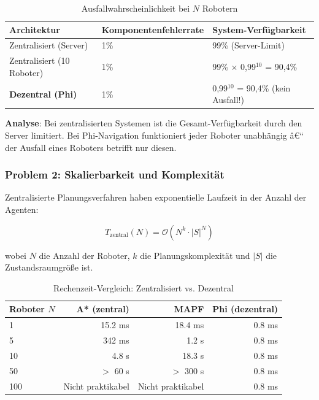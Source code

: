 ﻿\documentclass[a4paper,12pt]{article}
\theoremstyle{definition}
\begin{document}
\begin{table}[H]
	\centering
	\caption{Ausfallwahrscheinlichkeit bei $N$ Robotern}
	\label{tab:failure_prob}
	\begin{tabular}{p{4.5cm}p{4cm}p{4.5cm}}
		\toprule
		\textbf{Architektur} & \textbf{Komponenten\-fehlerrate} & \textbf{System-Verfügbarkeit} \\
		\midrule
		Zentralisiert (Server) & 1\% & 99\% (Server-Limit) \\
		Zentralisiert (10 Roboter) & 1\% & 99\% $\times$ 0,99$^{10}$ = 90,4\% \\
		\textbf{Dezentral (Phi)} & 1\% & 0,99$^{10}$ = 90,4\% (kein Ausfall!) \\
		\bottomrule
	\end{tabular}
\end{table}

\textbf{Analyse}: Bei zentralisierten Systemen ist die Gesamt-Verfügbarkeit durch den Server limitiert. Bei Phi-Navigation funktioniert jeder Roboter unabhängig â€“ der Ausfall eines Roboters betrifft nur diesen.

\subsubsection{Problem 2: Skalierbarkeit und Komplexität}

Zentralisierte Planungsverfahren haben exponentielle Laufzeit in der Anzahl der Agenten:

\begin{equation}
T_{\text{zentral}}(N) = \mathcal{O}(N^k \cdot |S|^N)
\end{equation}

wobei $N$ die Anzahl der Roboter, $k$ die Planungskomplexität und $|S|$ die Zustandsraumgröße ist.

\begin{table}[H]
	\centering
	\caption{Rechenzeit-Vergleich: Zentralisiert vs. Dezentral}
	\label{tab:scaling}
	\begin{tabular}{lrrr}
		\toprule
		\textbf{Roboter $N$} & \textbf{A* (zentral)} & \textbf{MAPF} & \textbf{Phi (dezentral)} \\
		\midrule
		1 & 15.2 ms & 18.4 ms & 0.8 ms \\
		5 & 342 ms & 1.2 s & 0.8 ms \\
		10 & 4.8 s & 18.3 s & 0.8 ms \\
		50 & $>$ 60 s & $>$ 300 s & 0.8 ms \\
		100 & Nicht praktikabel & Nicht praktikabel & 0.8 ms \\
		\bottomrule
	\end{tabular}
\end{table}
\end{document}
